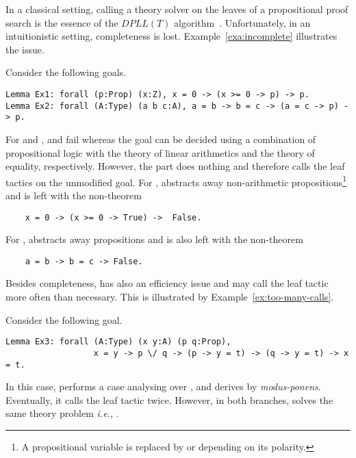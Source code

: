 \documentclass[a4paper,UKenglish,cleveref, autoref, thm-restate]{lipics-v2019}
\begin{document}
In a classical setting, calling a theory solver on the leaves of a
propositional proof search is the essence of the $\mathit{DPLL(T)}$
algorithm~\cite{GanzingerHNOT04}.  Unfortunately, in an intuitionistic
setting, completeness is lost. Example~\ref{exa:incomplete}
illustrates the issue.
\begin{example}
  \label{exa:incomplete}
  Consider the following goals.
  \begin{verbatim}
Lemma Ex1: forall (p:Prop) (x:Z), x = 0 -> (x >= 0 -> p) -> p.
Lemma Ex2: forall (A:Type) (a b c:A), a = b -> b = c -> (a = c -> p) -> p.
  \end{verbatim}
  For  and ,  and  fail whereas
  the goal can be decided using a combination of
  propositional logic with the theory of linear arithmetics and
  the theory of equality, respectively.  However, the  part does
  nothing and therefore calls the leaf tactics on the unmodified goal.  For ,
   abstracts away non-arithmetic propositions\footnote{A propositional variable is replaced by  or  depending on its polarity.} and is left
  with the non-theorem
  \begin{verbatim}
    x = 0 -> (x >= 0 -> True) ->  False.
  \end{verbatim}
  For ,  abstracts away
  propositions and is also left with the non-theorem
  \begin{verbatim}
    a = b -> b = c -> False.
  \end{verbatim}
\end{example}
Besides completeness,  has also an efficiency issue and may call the leaf tactic 
more often than necessary. %
This is illustrated by Example~\ref{ex:too-many-calls}.
\begin{example}
  \label{ex:too-many-calls}
  Consider the following goal.
  \begin{verbatim}
Lemma Ex3: forall (A:Type) (x y:A) (p q:Prop),
                  x = y -> p \/ q -> (p -> y = t) -> (q -> y = t) -> x = t.
  \end{verbatim}
  In this case,  performs a case analysing
  over , and derives  by
  \emph{modus-ponens}. Eventually, it calls the leaf tactic
   twice.  However, in both branches,
   solves the same theory problem \emph{i.e.},
  .
\end{example}
\end{document}
